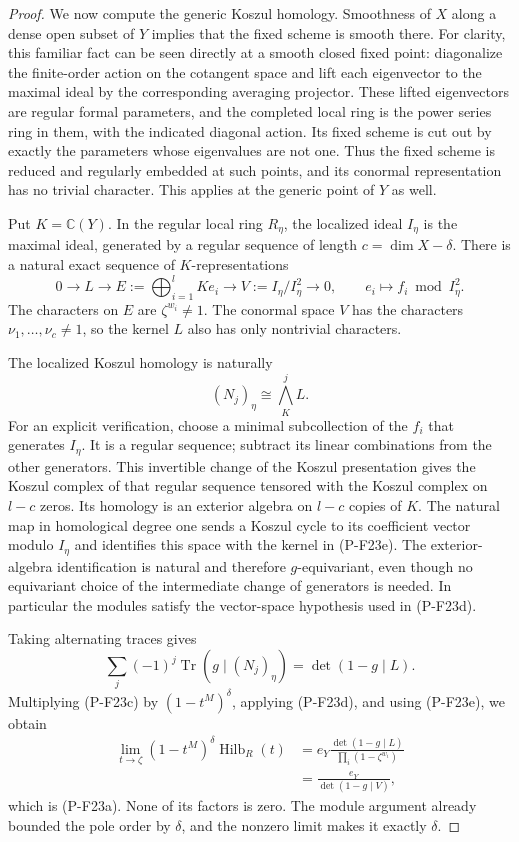 \documentclass[11pt,a4paper]{article}
\begin{document}
\begin{proof}
We now compute the generic Koszul homology. Smoothness of
$X$ along a dense open subset of $Y$ implies that the fixed
scheme is smooth there. For clarity, this familiar fact can
be seen directly at a smooth closed fixed point: diagonalize
the finite-order action on the cotangent space and lift each
eigenvector to the maximal ideal by the corresponding averaging
projector. These lifted eigenvectors are regular formal
parameters, and the completed local ring is the power series
ring in them, with the indicated diagonal action. Its fixed
scheme is cut out by exactly the parameters whose eigenvalues
are not one. Thus the fixed scheme is reduced and regularly
embedded at such points, and its conormal representation has
no trivial character. This applies at the generic point of
$Y$ as well.

Put $K=\mathbb C(Y)$. In the regular local ring $R_\eta$,
the localized ideal $I_\eta$ is the maximal ideal, generated
by a regular sequence of length $c=\dim X-\delta$. There
is a natural exact sequence of $K$-representations
\[
 0\longrightarrow L\longrightarrow
 E:=\bigoplus_{i=1}^l K e_i
 \longrightarrow V:=I_\eta/I_\eta^2\longrightarrow0,
 \qquad e_i\longmapsto f_i\bmod I_\eta^2.
 \tag{P-F23e}
\]
The characters on $E$ are $\zeta^{w_i}\ne1$.
The conormal space $V$ has the characters
$\nu_1,\ldots,\nu_c\ne1$, so the kernel $L$ also has
only nontrivial characters.

The localized Koszul homology is naturally
\[
 (N_j)_\eta\cong\bigwedge^j_K L.
 \tag{P-F23f}
\]
For an explicit verification, choose a minimal subcollection of
the $f_i$ that generates $I_\eta$. It is a regular sequence;
subtract its linear combinations from the other generators.
This invertible change of the Koszul presentation gives the
Koszul complex of that regular sequence tensored with the
Koszul complex on $l-c$ zeros. Its homology is an exterior
algebra on $l-c$ copies of $K$. The natural map in homological
degree one sends a Koszul cycle to its coefficient vector modulo
$I_\eta$ and identifies this space with the kernel in
(P-F23e). The exterior-algebra identification is natural and
therefore $g$-equivariant, even though no equivariant choice
of the intermediate change of generators is needed.
In particular the modules satisfy the vector-space hypothesis
used in (P-F23d).

Taking alternating traces gives
\[
 \sum_j(-1)^j\operatorname{Tr}(g\mid (N_j)_\eta)
       =\det(1-g\mid L).
\]
Multiplying (P-F23c) by $(1-t^M)^\delta$, applying
(P-F23d), and using (P-F23e), we obtain
\begin{align*}
 \lim_{t\to\zeta}(1-t^M)^\delta\operatorname{Hilb}_R(t)
 &=e_Y\frac{\det(1-g\mid L)}{
                         \prod_i(1-\zeta^{w_i})}\\
 &=\frac{e_Y}{\det(1-g\mid V)},
\end{align*}
which is (P-F23a). None of its factors is zero. The module
argument already bounded the pole order by $\delta$, and
the nonzero limit makes it exactly $\delta$.


\end{proof}
\end{document}
